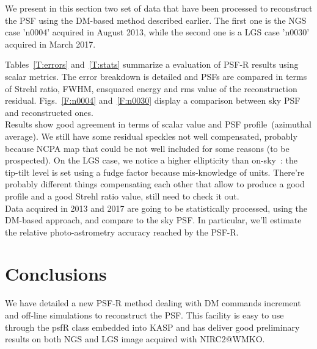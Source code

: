 \documentclass[12pt]{article}
\begin{document}
We present in this section two set of data that have been processed to reconstruct the PSF using the DM-based method described earlier. The first one is the NGS case 'n0004' acquired  in August 2013, while the second one is a LGS case 'n0030' acquired in March 2017.

Tables~\ref{T:errors} and~\ref{T:stats} summarize a evaluation of PSF-R results using scalar metrics. The error breakdown is detailed and PSFs are compared in terms of Strehl ratio, FWHM, ensquared energy and rms value of the reconstruction residual. Figs.~\ref{F:n0004} and~\ref{F:n0030} display a comparison between sky PSF and reconstructed ones.\\

Results show good agreement in terms of scalar value and PSF profile~(azimuthal average). We still have some residual speckles not well compensated, probably because NCPA map that could be not well included for some reasons (to be prospected). On the LGS case, we notice a higher ellipticity than on-sky~: the tip-tilt level is set using a fudge factor because mis-knowledge of units. There're probably different things compensating each other that allow to produce a good profile and a good Strehl ratio value, still need to check it out.\\

Data acquired in 2013 and 2017 are going to be statistically processed, using the DM-based approach, and compare to the sky PSF. In particular, we'll estimate the relative photo-astrometry accuracy reached by the PSF-R.\\
 
\section{Conclusions}

We have detailed a new PSF-R method dealing with DM commands increment and off-line simulations to reconstruct the PSF. This facility is easy to use through the psfR class embedded into KASP and has deliver good preliminary results on both NGS and LGS image acquired with NIRC2@WMKO.

 

\vspace{2cm}
\end{document}
